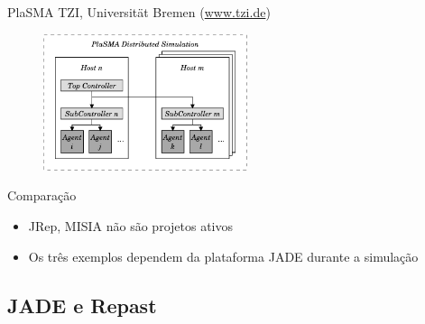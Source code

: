 \begin{frame}{PlaSMA}
	TZI, Universität Bremen (\url{www.tzi.de})

	\begin{figure}
		\centering
		\includegraphics[height=4cm]{figures/PlaSMA.pdf}
	\end{figure}
\end{frame}

\begin{frame}{Comparação}
	\begin{itemize}
		\item JRep, MISIA não são projetos ativos
		\item Os três exemplos dependem da plataforma JADE durante a simulação
	\end{itemize}
\end{frame}

\subsection{JADE e Repast}

